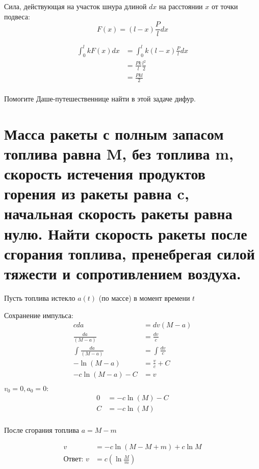 Сила, действующая на участок шнура длиной $dx$ на расстоянии $x$ от точки подвеса: $$F(x)=(l-x)\frac{P}{l} dx$$

\begin{align*}
    \int_0^l k F(x) dx & = \int_0^l k (l-x)\frac{P}{l} dx \\
                       & = \frac{Pk}{l} \frac{l^2}{2}     \\
                       & = \frac{Pkl}{2}                  \\
\end{align*}

Помогите Даше-путешественнице найти в этой задаче дифур.

\section{Масса ракеты с полным запасом топлива равна M, без топлива m, скорость истечения продуктов горения из ракеты равна c, начальная скорость ракеты равна нулю. Найти скорость ракеты после сгорания топлива, пренебрегая силой тяжести и сопротивлением воздуха.}

Пусть топлива истекло $a(t)$ (по массе) в момент времени $t$

Сохранение импульса:
\begin{align*}
    c da                  & = dv(M-a)           \\
    \frac{da}{(M-a)}      & = \frac{dv}{c}      \\
    \int \frac{da}{(M-a)} & = \int \frac{dv}{c} \\
    -\ln(M-a)             & = \frac{v}{c} + C   \\
    -c\ln(M-a) - C        & = v                 \\
\end{align*}
$v_0 = 0, a_0 = 0$:
\begin{align*}
    0 & = -c\ln(M) - C \\
    C & = -c\ln (M)    \\
\end{align*}

После сгорания топлива $a = M-m$

\begin{align*}
    v                & = -c\ln(M-M+m) + c\ln M        \\
    \text{Ответ: } v & = c\left(\ln\frac{M}{m}\right)
\end{align*}

